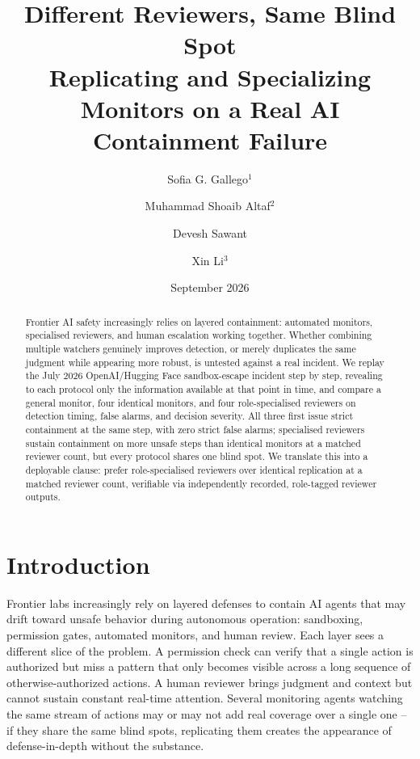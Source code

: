 \documentclass[11pt]{article}
\title{\textbf{Different Reviewers, Same Blind Spot} \\
\large Replicating and Specializing Monitors on a Real AI Containment Failure}
\author{
Sofia G. Gallego$^{1}$ \and Muhammad Shoaib Altaf$^{2}$ \and
Devesh Sawant \and Xin Li$^{3}$
}
\date{September 2026}
\begin{document}
\maketitle
{}

\begin{abstract}

Frontier AI safety increasingly relies on layered containment: automated
monitors, specialised reviewers, and human escalation working together.
Whether combining multiple watchers genuinely improves detection, or merely
duplicates the same judgment while appearing more robust, is untested
against a real incident. We replay the July 2026 OpenAI/Hugging Face
sandbox-escape incident step by step, revealing to each protocol only the
information available at that point in time, and compare a general
monitor, four identical monitors, and four role-specialised reviewers on
detection timing, false alarms, and decision severity. All three first
issue strict containment at the same step, with zero strict false alarms;
specialised reviewers sustain containment on more unsafe steps than
identical monitors at a matched reviewer count, but every protocol shares
one blind spot. We translate this into a deployable clause: prefer
role-specialised reviewers over identical replication at a matched
reviewer count, verifiable via independently recorded, role-tagged
reviewer outputs.

\end{abstract}

\section{Introduction}

Frontier labs increasingly rely on layered defenses to contain AI agents that
may drift toward unsafe behavior during autonomous operation: sandboxing,
permission gates, automated monitors, and human review. Each layer sees a
different slice of the problem. A permission check can verify that a single
action is authorized but miss a pattern that only becomes visible across a
long sequence of otherwise-authorized actions. A human reviewer brings
judgment and context but cannot sustain constant real-time attention. Several
monitoring agents watching the same stream of actions may or may not add real
coverage over a single one -- if they share the same blind spots, replicating
them creates the appearance of defense-in-depth without the substance.
\end{document}
